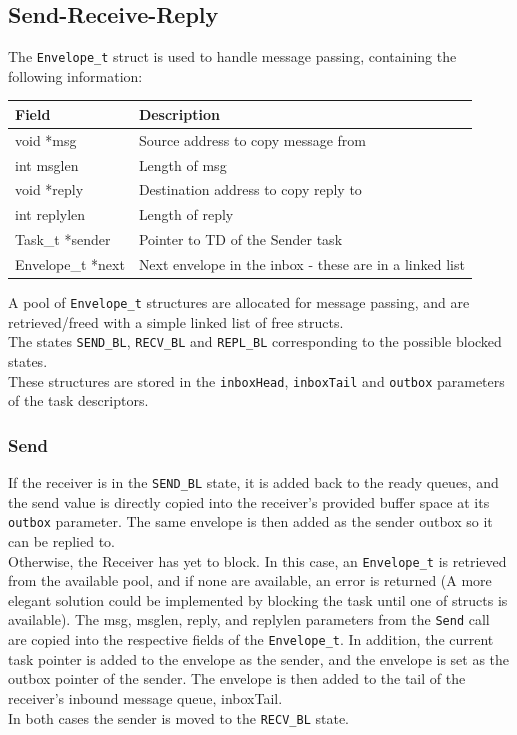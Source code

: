 \documentclass[12pt]{article}
\begin{document}
\subsection{Send-Receive-Reply}
The \texttt{Envelope\_t} struct is used to handle message passing, containing the following information:
\begin{center}
  \begin{tabular}{|l|l|}
    \hline
    {\bf Field} & {\bf Description} \\\hline
    void *msg & Source address to copy message from \\\hline
    int msglen & Length of msg \\\hline
    void *reply & Destination address to copy reply to \\\hline
    int replylen & Length of reply \\\hline
    Task\_t *sender & Pointer to TD of the Sender task \\\hline
    Envelope\_t *next & Next envelope in the inbox - these are in a linked list \\\hline
  \end{tabular}
\end{center}
A pool of \texttt{Envelope\_t} structures are allocated for message passing, and are retrieved/freed with a simple linked list of free structs.
\\
The states \texttt{SEND\_BL}, \texttt{RECV\_BL} and \texttt{REPL\_BL} corresponding to the possible blocked states.
\\
These structures are stored in the \texttt{inboxHead}, \texttt{inboxTail} and \texttt{outbox} parameters of the task descriptors.

\subsubsection{Send}
If the receiver is in the \texttt{SEND\_BL} state, it is added back to the ready queues, and the send value is directly
copied into the receiver's provided buffer space at its \texttt{outbox} parameter. The same envelope is then added as
the sender outbox so it can be replied to.
\\
Otherwise, the Receiver has yet to block. In this case, an \texttt{Envelope\_t} is retrieved from the available pool,
and if none are available, an error is returned (A more elegant solution could be implemented by blocking the task until
one of structs is available). The msg, msglen, reply, and replylen parameters from the \texttt{Send} call are copied into 
the respective fields of the \texttt{Envelope\_t}. In addition, the current task pointer is added to the envelope as the 
sender, and the envelope is set as the outbox pointer of the sender. The envelope is then added to the tail of the
receiver's inbound message queue, inboxTail.
\\
In both cases the sender is moved to the \texttt{RECV\_BL} state. 
\end{document}
